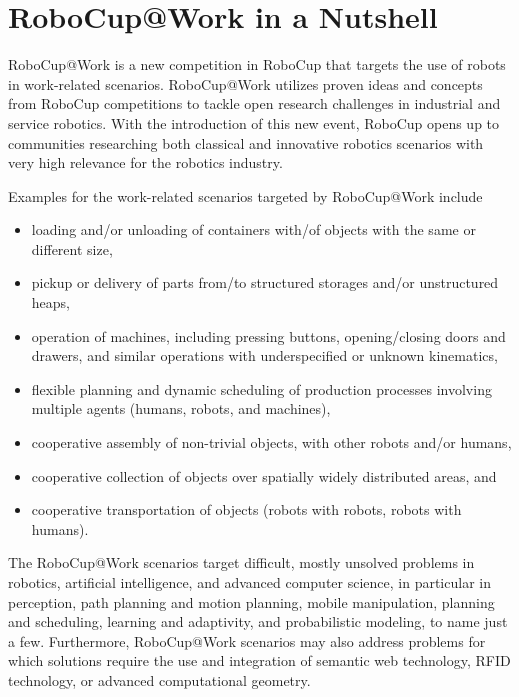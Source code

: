 \section{RoboCup@Work in a Nutshell}\label{sec:at_work_nushell}
RoboCup@Work is a new competition in RoboCup that targets the use of robots in work-related scenarios. RoboCup@Work utilizes proven ideas and concepts from RoboCup competitions to tackle open research challenges in industrial and service robotics. With the introduction of this new event, RoboCup opens up to communities researching both classical and innovative robotics scenarios with very high relevance for the robotics industry. 
\par
Examples for the work-related scenarios targeted by RoboCup@Work include 

\begin{itemize}
	\item loading and/or unloading of containers with/of objects with the same 	or different size,
	\item pickup or delivery of parts from/to structured storages and/or 				unstructured heaps,
	\item operation of machines, including pressing buttons, opening/closing 			doors and drawers, and similar operations with underspecified or unknown 			kinematics,
	\item flexible planning and dynamic scheduling of production processes 			involving multiple agents (humans, robots, and machines),
	\item cooperative assembly of non-trivial objects, with other robots 				and/or humans,
	\item cooperative collection of objects over spatially widely  distributed 	areas, and
	\item cooperative transportation of objects (robots with robots, robots 			with humans).
\end{itemize}

The RoboCup@Work scenarios target difficult, mostly unsolved problems in robotics, artificial intelligence, and advanced computer science, in particular in perception, path planning and motion planning, mobile manipulation, planning and scheduling, learning and adaptivity, and probabilistic modeling, to name just a few. Furthermore, RoboCup@Work scenarios may also address problems for which solutions require the use and integration of semantic web technology, RFID technology, or advanced computational geometry.
\par

